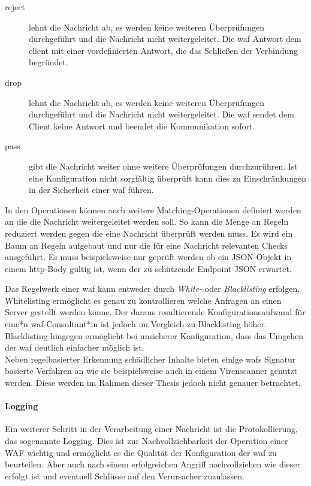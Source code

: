 \begin{description}
    \item[reject] lehnt die Nachricht ab, es werden keine weiteren Überprüfungen durchgeführt und die Nachricht nicht weitergeleitet.
    Die \ac{waf} Antwort dem client mit einer vordefinierten Antwort, die das Schließen der Verbindung begründet.
    \item[drop] lehnt die Nachricht ab, es werden keine weiteren Überprüfungen durchgeführt und die Nachricht nicht weitergeleitet.
    Die \ac{waf} sendet dem Client keine Antwort und beendet die Kommunikation sofort.
    \item[pass] gibt die Nachricht weiter ohne weitere Überprüfungen durchzurühren.
    Ist eine Konfiguration nicht sorgfältig überprüft kann dies zu Einschränkungen in der Sicherheit einer \ac{waf} führen.
\end{description}

In den Operationen können auch weitere Matching-Operationen definiert werden an die die Nachricht weitergeleitet werden soll.
So kann die Menge an Regeln reduziert werden gegen die eine Nachricht überprüft werden muss.
Es wird ein Baum an Regeln aufgebaut und nur die für eine Nachricht relevanten Checks ausgeführt.
Es muss beispielsweise nur geprüft werden ob ein JSON-Objekt in einem \ac{http}-Body gültig ist, wenn der zu schützende Endpoint JSON erwartet.

Das Regelwerk einer \ac{waf} kann entweder durch \textit{White-} oder \textit{Blacklisting} erfolgen.
Whitelisting ermöglicht es genau zu kontrollieren welche Anfragen an einen Server gestellt werden könne.
Der daraus resultierende Konfigurationsaufwand für eine*n \ac{waf}-Consultant*in ist jedoch im Vergleich zu Blacklisting höher.
Blacklisting hingegen ermöglicht bei unsicherer Konfiguration, dass das Umgehen der \ac{waf} deutlich einfacher möglich ist.\\

Neben regelbasierter Erkennung schädlicher Inhalte bieten einige \acp{waf} Signatur basierte Verfahren an wie sie beispielsweise auch in einem Virenscanner genutzt werden.
Diese werden im Rahmen dieser Thesis jedoch nicht genauer betrachtet.

\paragraph{Logging}
Ein weiterer Schritt in der Verarbeitung einer Nachricht ist die Protokollierung, das sogenannte Logging.
Dies ist zur Nachvollziehbarkeit der Operation einer WAF wichtig und ermöglicht es die Qualität der Konfiguration der \ac{waf} zu beurteilen.
Aber auch nach einem erfolgreichen Angriff nachvollziehen wie dieser erfolgt ist und eventuell Schlüsse auf den Verursacher zuzulassen.

